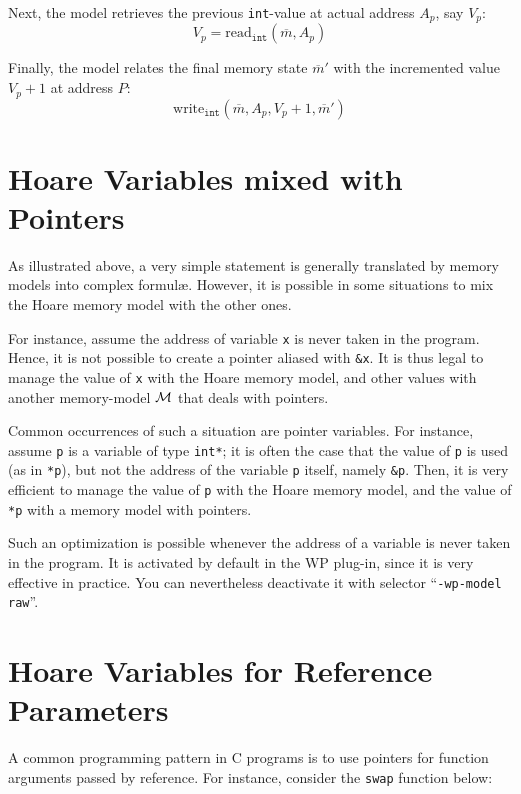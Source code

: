 Next, the model retrieves the previous \lstinline{int}-value at
actual address $A_p$, say $V_p$:
\[ V_p = \mathrm{read}_{\mathtt{int}}(\overline{m},A_p) \]

Finally, the model relates the final memory state $\overline{m}'$
with the incremented value $V_p+1$ at address $P$:
\[ \mathrm{write}_{\mathtt{int}}(\overline{m},A_p,V_p+1,\overline{m}') \]

\section{Hoare Variables mixed with Pointers}
\label{wp-model-logicvar}

As illustrated above, a very simple statement is generally translated
by memory models into complex formul{\ae}. However, it is possible in
some situations to mix the Hoare memory model with the other ones.

For instance, assume the address of variable \lstinline{x} is never
taken in the program. Hence, it is not possible to create a pointer
aliased with \lstinline{&x}. It is thus legal to manage the value of
\lstinline{x} with the Hoare memory model, and other values with
another memory-model $\cal{M}$ that deals with pointers.

Common occurrences of such a situation are pointer variables. For
instance, assume \lstinline{p} is a variable of type \lstinline{int*};
it is often the case that the value of \lstinline{p} is used (as in
\lstinline{*p}), but not the address of the variable \lstinline{p}
itself, namely \lstinline{&p}. Then, it is very efficient to manage
the value of \lstinline{p} with the Hoare memory model, and the value
of \lstinline{*p} with a memory model with pointers.

Such an optimization is possible whenever the address of a variable is
never taken in the program. It is activated by default in the
\textsf{WP} plug-in, since it is very effective in practice. You can
nevertheless deactivate it with selector ``\texttt{-wp-model raw}''.

\section{Hoare Variables for Reference Parameters}
\label{wp-model-byreference}

A common programming pattern in \textsf{C} programs is to use pointers
for function arguments passed by reference. For instance, consider the
\lstinline{swap} function below:

